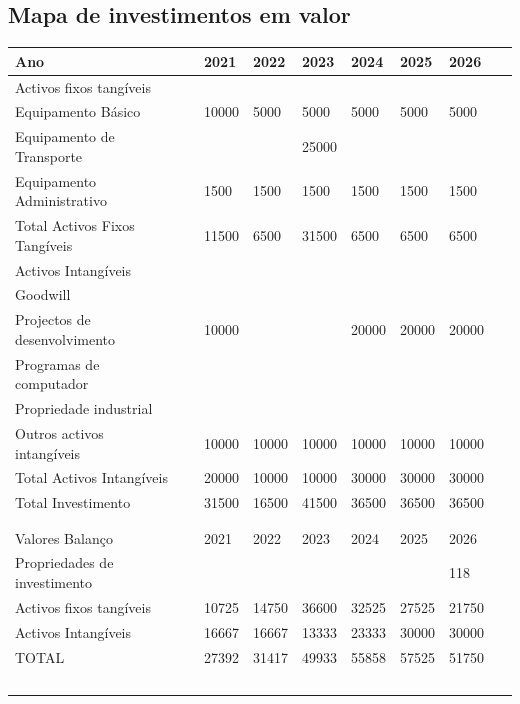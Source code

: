 \documentclass[a4paper]{article}
\begin{document}
\subsection{Mapa de investimentos em valor}
\begin{table}[h]
\begin{tabular}{ | l | l | l | l | l | l | l | l | l | }
\hline
	Ano &  & 2021 & 2022 & 2023 & 2024 & 2025 & 2026 &  \\ \hline
	Activos fixos tangíveis &  &  &  &  &  &  &  &  \\ \hline
	Equipamento  Básico &  & 10000 & 5000 & 5000 & 5000 & 5000 & 5000 &  \\ \hline
	Equipamento de Transporte &  &  &  & 25000 &  &  &  &  \\ \hline
	Equipamento Administrativo &  & 1500 & 1500 & 1500 & 1500 & 1500 & 1500 &  \\ \hline
	Total Activos Fixos Tangíveis &  & 11500 & 6500 & 31500 & 6500 & 6500 & 6500 &  \\ \hline
	Activos Intangíveis &  &  &  &  &  &  &  &  \\ \hline
	Goodwill &  &  &  &  &  &  &  &  \\ \hline
	Projectos de desenvolvimento &  & 10000 &  &  & 20000 & 20000 & 20000 &  \\ \hline
	Programas de computador &  &  & &  &  &  &  &  \\ \hline
	Propriedade industrial &  &  &  &  &  &  &  &  \\ \hline
	Outros activos intangíveis &  & 10000 & 10000 & 10000 & 10000 & 10000 & 10000 &  \\ \hline
	Total Activos Intangíveis &  & 20000 & 10000 & 10000 & 30000 & 30000 & 30000 &  \\ \hline
	Total Investimento &  & 31500 & 16500 & 41500 & 36500 & 36500 & 36500 &  \\ \hline
	 &  &  &  &  &  &  &  &  \\ \hline
	 &  &  &  &  &  &  &  &  \\ \hline
	Valores Balanço &  & 2021 & 2022 & 2023 & 2024 & 2025 & 2026 &  \\ \hline
	Propriedades de investimento &  &  &  &  &  &  & 118 &  \\ \hline
	Activos fixos tangíveis &  & 10725  & 14750 & 36600 & 32525 & 27525 & 21750 &  \\ \hline
	Activos Intangíveis &  & 16667 & 16667 & 13333 & 23333 & 30000 & 30000 &  \\ \hline
	TOTAL &  & 27392 & 31417 & 49933 & 55858 & 57525 & 51750 &  \\ \hline
	 & \  & \  & \  & \  & \  & \  & \  & \  \\ \hline
\end{tabular}
\end{table}
\end{document}
